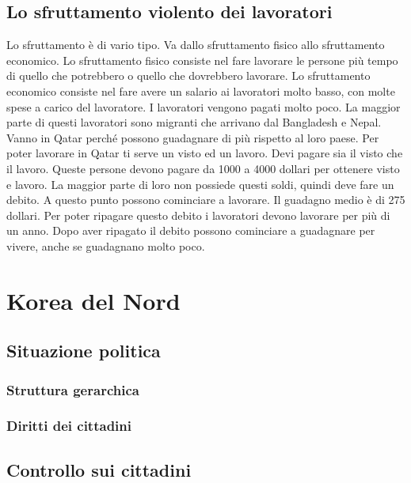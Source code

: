 \documentclass[a4paper, 12pt]{article}
\begin{document}
\subsection{Lo sfruttamento violento dei lavoratori}

Lo sfruttamento è di vario tipo. Va dallo sfruttamento fisico allo sfruttamento  economico. Lo sfruttamento fisico consiste nel fare lavorare le persone più tempo di quello che potrebbero o quello che dovrebbero lavorare. Lo sfruttamento economico consiste nel fare avere un salario ai lavoratori molto basso, con molte spese a carico del lavoratore. I lavoratori vengono pagati molto poco. La maggior parte di questi lavoratori sono migranti che arrivano dal Bangladesh e Nepal. Vanno in Qatar perché possono guadagnare di più rispetto al loro paese. Per poter lavorare in Qatar ti serve un visto ed un lavoro. Devi pagare sia il visto che il lavoro. Queste persone devono pagare da 1000 a 4000 dollari per ottenere visto e lavoro. La maggior parte di loro non possiede questi soldi, quindi deve fare un debito. A questo punto possono cominciare a lavorare. Il guadagno medio è di 275 dollari. Per poter ripagare questo debito i lavoratori devono lavorare per più di un anno. Dopo aver ripagato il debito possono cominciare a guadagnare per vivere, anche se guadagnano molto poco.


\section{Korea del Nord}

\subsection{Situazione politica}

\subsubsection{Struttura gerarchica}

\subsubsection{Diritti dei cittadini}

\subsection{Controllo sui cittadini}
\end{document}
